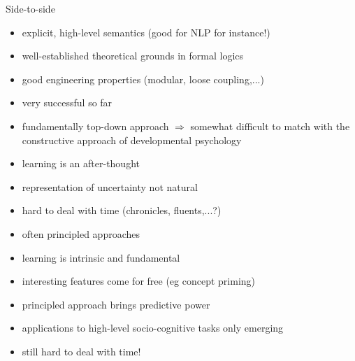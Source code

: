 \documentclass[compress]{beamer}
\begin{document}
\begin{frame}{Side-to-side}

    \scriptsize
    \begin{multicols}{2}


    \begin{itemize}
        \item {\Medium explicit}, {\Medium high-level semantics} (good for NLP for instance!)
        \item {\Medium well-established theoretical grounds} in formal logics
        \item good engineering properties (modular, loose coupling,...)
        \item {\Medium very successful} so far
        \item {\Medium fundamentally top-down} approach $\Rightarrow$ somewhat difficult to match with
            the constructive approach of developmental psychology
        \item {\Medium learning} is an {\Medium after-thought}
        \item representation of {\Medium uncertainty not natural}
        \item {\Medium hard to deal with time} (chronicles, fluents,...?)
    \end{itemize}

    \columnbreak


    \begin{itemize}
        \item often {\Medium principled approaches}
        \item {\Medium learning} is intrinsic and fundamental
        \item {\Medium interesting features} come for free (eg concept priming)
        \item principled approach brings {\Medium predictive power}
        \item applications to high-level socio-cognitive tasks only emerging
        \item {\Medium still hard to deal with time!}
    \end{itemize}

    \end{multicols}
\end{frame}
\end{document}
